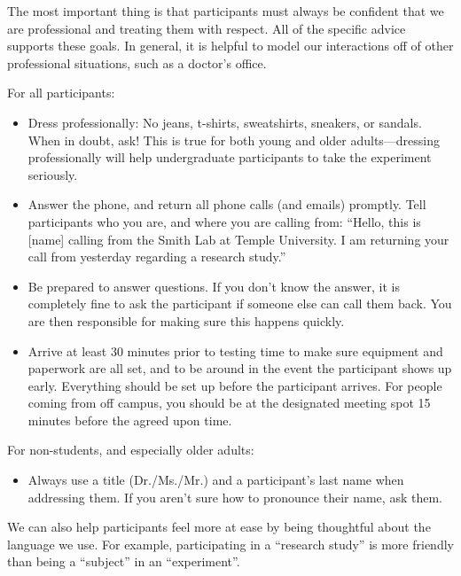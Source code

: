 \documentclass[letterpaper,12pt,oneside]{memoir}
\begin{document}
{The most important thing is that participants must always be confident that we are professional and treating them with respect. All of the specific advice supports these goals. In general, it is helpful to model our interactions off of other professional situations, such as a doctor's office.

For all participants:

\begin{itemize}

\item Dress professionally: No jeans, t-shirts, sweatshirts, sneakers, or sandals. When in doubt, ask! This is true for both young and older adults---dressing professionally will help undergraduate participants to take the experiment seriously.

\item Answer the phone, and return all phone calls (and emails) promptly. Tell participants who you are, and where you are calling from: ``Hello, this is [name] calling from the Smith Lab at Temple University. I am returning your call from yesterday regarding a research study.''

\item Be prepared to answer questions. If you don't know the answer, it is completely fine to ask the participant if someone else can call them back. You are then responsible for making sure this happens quickly.

\item Arrive at least 30 minutes prior to testing time to make sure equipment and paperwork are all set, and to be around in the event the participant shows up early. Everything should be set up before the participant arrives. For people coming from off campus, you should be at the designated meeting spot 15 minutes before the agreed upon time.

\end{itemize}
	
For non-students, and especially older adults:

\begin{itemize}
\item Always use a title (Dr./Ms./Mr.) and a participant's last name when addressing them. If you aren't sure how to pronounce their name, ask them.
\end{itemize}

We can also help participants feel more at ease by being thoughtful about the language we use. For example, participating in a ``research study'' is more friendly than being a ``subject'' in an ``experiment''.

}
\end{document}
